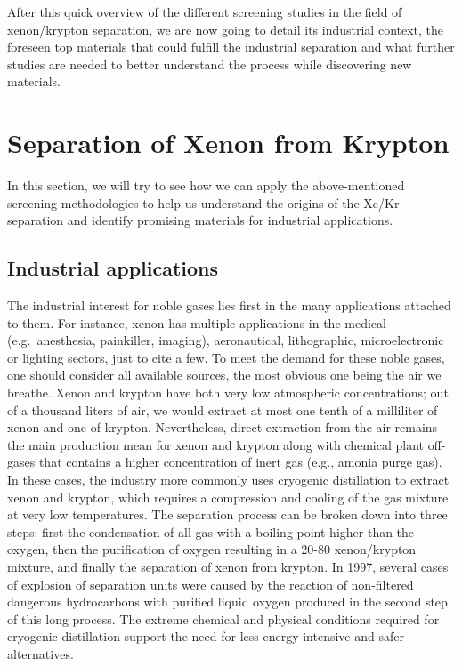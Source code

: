 \documentclass[main.tex]{subfiles}
\begin{document}
After this quick overview of the different screening studies in the field of xenon/krypton separation, we are now going to detail its industrial context, the foreseen top materials that could fulfill the industrial separation and what further studies are needed to better understand the process while discovering new materials.


\section{Separation of Xenon from Krypton}

In this section, we will try to see how we can apply the above-mentioned screening methodologies to help us understand the origins of the Xe/Kr separation and identify promising materials for industrial applications. 

\subsection{Industrial applications}


The industrial interest for noble gases lies first in the many applications attached to them. For instance, xenon has multiple applications in the medical (e.g.\ anesthesia, painkiller, imaging),\cite{cullen1951anesthetic, holstrater2011intranasal,Mammarappallil_2019} aeronautical\cite{Patterson_2002,Coxhill_2005}, lithographic\cite{Abramov_2018}, microelectronic\cite{Chang_1995} or lighting sectors,\cite{Jarman_1974,Tanaka_2019} just to cite a few. To meet the demand for these noble gases, one should consider all available sources, the most obvious one being the air we breathe. Xenon and krypton have both very low atmospheric concentrations; out of a thousand liters of air, we would extract at most one tenth of a milliliter of xenon and one of krypton.\cite{kerry2007industrial} Nevertheless, direct extraction from the air remains the main production mean for xenon and krypton along with chemical plant off-gases that contains a higher concentration of inert gas (e.g., amonia purge gas). In these cases, the industry more commonly uses cryogenic distillation to extract xenon and krypton, which requires a compression and cooling of the gas mixture at very low temperatures. The separation process can be broken down into three steps: first the condensation of all gas with a boiling point higher than the oxygen, then the purification of oxygen resulting in a 20-80 xenon/krypton mixture, and finally the separation of xenon from krypton. In 1997, several cases of explosion of separation units were caused by the reaction of non-filtered dangerous hydrocarbons with purified liquid oxygen produced in the second step of this long process.\cite{distill_accident,distill_accident2} The extreme chemical and physical conditions required for cryogenic distillation support the need for less energy-intensive and safer alternatives. 
\end{document}
